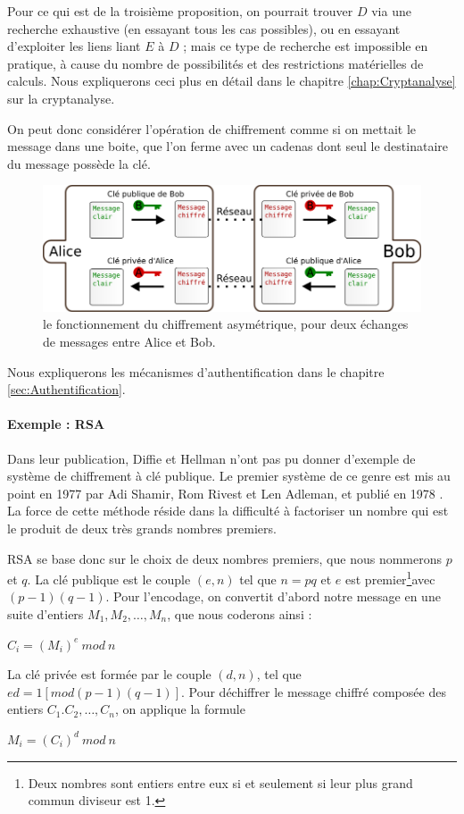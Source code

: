 Pour ce qui est de la troisième proposition, on pourrait trouver $D$
via une recherche exhaustive (en essayant tous les cas possibles), ou
en essayant d'exploiter les liens liant $E$ à $D$ ; mais ce type
de recherche est impossible en pratique, à cause du nombre de
possibilités et des restrictions matérielles de calculs. Nous
expliquerons ceci plus en détail dans le chapitre
\ref{chap:Cryptanalyse} sur la cryptanalyse.

On peut donc considérer l'opération de chiffrement comme si on
mettait le message dans une boite, que l'on ferme avec un cadenas
dont seul le destinataire du message possède la clé.

\begin{figure}[h]
  \begin{center}
    \includegraphics[scale=0.5]{images/ChiffrementAsymetrique.png}
  \end{center}
  \caption{le fonctionnement du chiffrement asymétrique, pour deux
    échanges de messages entre Alice et Bob.}
  \label{fig:ChiffrementSymetrique}
\end{figure}

Nous expliquerons les mécanismes d'authentification dans le 
chapitre \ref{sec:Authentification}. \\

\paragraph{Exemple : RSA}
Dans leur publication, Diffie et Hellman n'ont pas pu donner
d'exemple de système de chiffrement à clé publique. Le premier
système de ce genre est mis au point en 1977 par Adi Shamir, Rom
Rivest et Len Adleman, et publié en 1978 \cite{RSAPaper}.
La force de cette méthode réside dans la difficulté à factoriser
un nombre qui est le produit de deux très grands nombres premiers. 

RSA se base donc sur le choix de deux nombres premiers, que nous
nommerons $p$ et $q$.
La clé publique est le couple $(e,n)$ tel que $n = p q$ et $e$ est
premier\footnote{Deux nombres sont entiers
entre eux si et seulement si leur plus grand commun diviseur est 1.}avec $(p-1) (q-1)$.
Pour l'encodage, on convertit d'abord notre message en une suite
d'entiers $M_1, M_2, \dots, M_n$, %
que nous coderons ainsi :
\begin{center}
  $C_i = (M_i)^e ~mod~n$
\end{center}

La clé privée est formée par le couple $(d,n)$, tel que
$e d = 1 [mod (p-1) (q-1)]$.
Pour déchiffrer le message chiffré composée des entiers $C_1. C_2,
\dots, C_n$, on applique la formule
\begin{center}
  $M_i = (C_i)^d ~mod~n$
\end{center}


